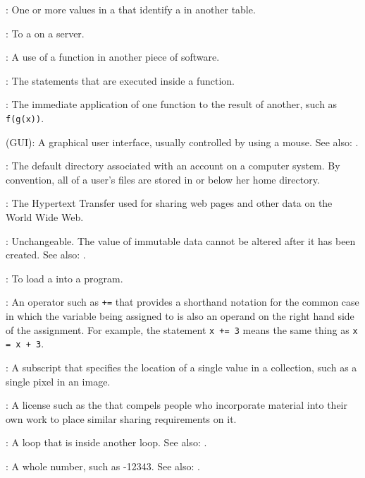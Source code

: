 :
One or more values in a
 that identify a
 in another table.

:
To  a  
on a server.

:
A use of a function in another piece of
software.

:
The statements that are executed inside a
function.

:
The immediate application of one function
to the result of another, such as \texttt{f(g(x))}.

 (GUI):
A graphical user interface,
usually controlled by using a mouse. See also:
.

:
The default directory associated with an
account on a computer system. By convention, all of a user's files are
stored in or below her home directory.

:
The Hypertext Transfer  used for sharing web pages and other data
on the World Wide Web.

:
Unchangeable. The value of immutable data cannot be
altered after it has been created. See also:
.

:
To load a  into a program.

:
An operator such as \texttt{+=} that
provides a shorthand notation for the common case in which the variable
being assigned to is also an operand on the right hand side of the
assignment. For example, the statement \texttt{x += 3} means the same
thing as \texttt{x = x + 3}.

:
A subscript that specifies the location of a single
value in a collection, such as a single pixel in an image.

:
A license such as the
 that compels people
who incorporate material into their own work to place similar sharing
requirements on it.

:
A loop that is inside another loop. See also:
.

:
A whole number, such as -12343. See also:
.

